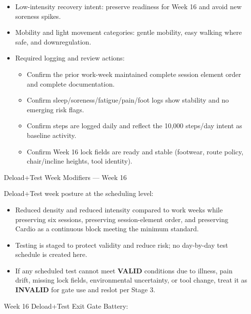 \documentclass[10pt]{article}
\begin{document}
\begin{landscape}
\begin{itemize}
\item Low-intensity recovery intent: preserve readiness for Week 16 and avoid new soreness spikes.
\item Mobility and light movement categories: gentle mobility, easy walking where safe, and downregulation.
\item Required logging and review actions:
\begin{itemize}
\item Confirm the prior work-week maintained complete session element order and complete documentation.
\item Confirm sleep/soreness/fatigue/pain/foot logs show stability and no emerging risk flags.
\item Confirm steps are logged daily and reflect the 10,000 steps/day intent as baseline activity.
\item Confirm Week 16 lock fields are ready and stable (footwear, route policy, chair/incline heights, tool identity).
\end{itemize}
\end{itemize}

Deload+Test Week Modifiers — Week 16\par\vspace{0.25em}

Deload+Test week posture at the scheduling level:

\begin{itemize}
\item Reduced density and reduced intensity compared to work weeks while preserving six sessions, preserving session-element order, and preserving Cardio as a continuous block meeting the minimum standard.
\item Testing is staged to protect validity and reduce risk; no day-by-day test schedule is created here.
\item If any scheduled test cannot meet \textbf{VALID} conditions due to illness, pain drift, missing lock fields, environmental uncertainty, or tool change, treat it as \textbf{INVALID} for gate use and reslot per Stage 3.
\end{itemize}

Week 16 Deload+Test Exit Gate Battery:


\end{landscape}
\end{document}
